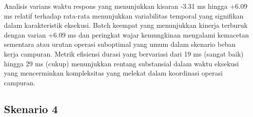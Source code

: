 Analisis varians waktu respons yang menunjukkan kisaran -3.31 ms hingga +6.09 ms relatif terhadap rata-rata menunjukkan variabilitas temporal yang signifikan dalam karakteristik eksekusi. Batch keempat yang menunjukkan kinerja terburuk dengan varian +6.09 ms dan peringkat wajar kemungkinan mengalami kemacetan sementara atau urutan operasi suboptimal yang umum dalam skenario beban kerja campuran. Metrik efisiensi durasi yang bervariasi dari 19 ms (sangat baik) hingga 29 ms (cukup) menunjukkan rentang substansial dalam waktu eksekusi yang mencerminkan kompleksitas yang melekat dalam koordinasi operasi campuran.

\subsection{Skenario 4}

